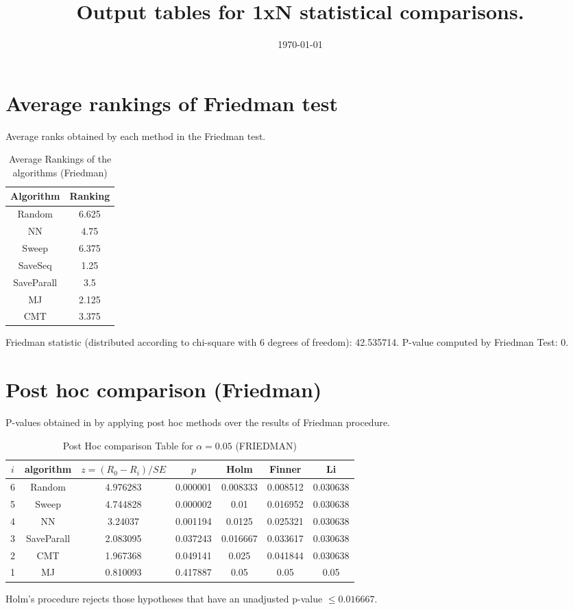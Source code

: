 \documentclass[a4paper,10pt]{article}
\title{Output tables for 1xN statistical comparisons.}
\author{}
\date{\today}
\begin{document}
\begin{landscape}
\pagestyle{empty}
\maketitle
\thispagestyle{empty}

\section{Average rankings of Friedman test}


Average ranks obtained by each method in the Friedman test.

\begin{table}[!htp]
\centering
\begin{tabular}{|c|c|}\hline
Algorithm&Ranking\\\hline
Random&6.625\\NN&4.75\\Sweep&6.375\\SaveSeq&1.25\\SaveParall&3.5\\MJ&2.125\\CMT&3.375\\\hline\end{tabular}
\caption{Average Rankings of the algorithms (Friedman)}
\end{table}

Friedman statistic (distributed according to chi-square with 6 degrees of freedom): 42.535714. \newline P-value computed by Friedman Test: 0.\newline


\newpage

\section{Post hoc comparison (Friedman)}


P-values obtained in by applying post hoc methods over the results of Friedman procedure.

\begin{table}[!htp]
\centering\footnotesize
\begin{tabular}{ccccccc}
$i$&algorithm&$z=(R_0 - R_i)/SE$&$p$&Holm &Finner&Li\\
\hline6&Random&4.976283&0.000001&0.008333&0.008512&0.030638\\5&Sweep&4.744828&0.000002&0.01&0.016952&0.030638\\4&NN&3.24037&0.001194&0.0125&0.025321&0.030638\\3&SaveParall&2.083095&0.037243&0.016667&0.033617&0.030638\\2&CMT&1.967368&0.049141&0.025&0.041844&0.030638\\1&MJ&0.810093&0.417887&0.05&0.05&0.05\\\hline
\end{tabular}
\caption{Post Hoc comparison Table for $\alpha=0.05$ (FRIEDMAN)}
\end{table}Holm's procedure rejects those hypotheses that have an unadjusted p-value $\le0.016667$.


\end{landscape}
\end{document}
